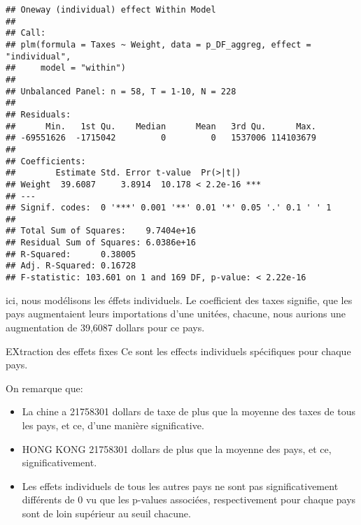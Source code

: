\documentclass[
]{book}
\providecommand{\tightlist}{%
  \setlength{\itemsep}{0pt}\setlength{\parskip}{0pt}}
\begin{document}
\begin{verbatim}
## Oneway (individual) effect Within Model
## 
## Call:
## plm(formula = Taxes ~ Weight, data = p_DF_aggreg, effect = "individual", 
##     model = "within")
## 
## Unbalanced Panel: n = 58, T = 1-10, N = 228
## 
## Residuals:
##      Min.   1st Qu.    Median      Mean   3rd Qu.      Max. 
## -69551626  -1715042         0         0   1537006 114103679 
## 
## Coefficients:
##        Estimate Std. Error t-value  Pr(>|t|)    
## Weight  39.6087     3.8914  10.178 < 2.2e-16 ***
## ---
## Signif. codes:  0 '***' 0.001 '**' 0.01 '*' 0.05 '.' 0.1 ' ' 1
## 
## Total Sum of Squares:    9.7404e+16
## Residual Sum of Squares: 6.0386e+16
## R-Squared:      0.38005
## Adj. R-Squared: 0.16728
## F-statistic: 103.601 on 1 and 169 DF, p-value: < 2.22e-16
\end{verbatim}

ici, nous modélisons les éffets individuels.
Le coefficient des taxes signifie, que les pays augmentaient leurs importations d'une unitées, chacune, nous aurions une augmentation de 39,6087 dollars pour ce pays.

EXtraction des effets fixes
Ce sont les effects individuels spécifiques pour chaque pays.

On remarque que:

\begin{itemize}
\tightlist
\item
  La chine a 21758301 dollars de taxe de plus que la moyenne des taxes de tous les pays, et ce, d'une manière significative.
\item
  HONG KONG 21758301 dollars de plus que la moyenne des pays, et ce, significativement.
\item
  Les effets individuels de tous les autres pays ne sont pas significativement différents de 0 vu que les p-values associées, respectivement pour chaque pays sont de loin supérieur au seuil chacune.
\end{itemize}
\end{document}
